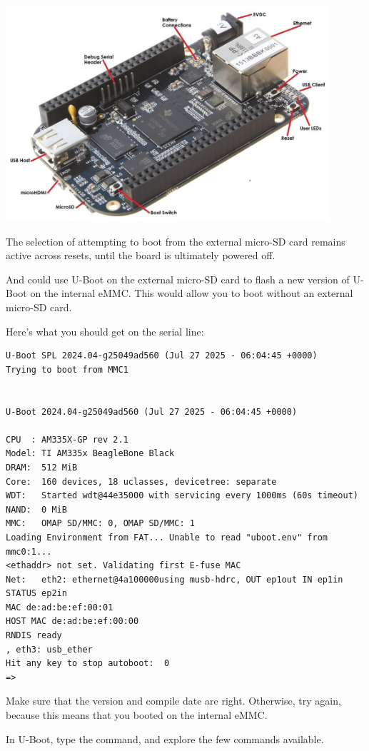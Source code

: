 \begin{center}
\includegraphics[width=12cm]{labs/u-boot-installing-bbb/bbb-peripheral.png}
\end{center}

The selection of attempting to boot from the external micro-SD card
remains active across resets, until the board is ultimately powered off.

And could use U-Boot on the external micro-SD card to flash a new version of U-Boot
on the internal eMMC. This would allow you to boot without an external micro-SD card.

Here's what you should get on the serial line:

\begin{verbatim}
U-Boot SPL 2024.04-g25049ad560 (Jul 27 2025 - 06:04:45 +0000)
Trying to boot from MMC1


U-Boot 2024.04-g25049ad560 (Jul 27 2025 - 06:04:45 +0000)

CPU  : AM335X-GP rev 2.1
Model: TI AM335x BeagleBone Black
DRAM:  512 MiB
Core:  160 devices, 18 uclasses, devicetree: separate
WDT:   Started wdt@44e35000 with servicing every 1000ms (60s timeout)
NAND:  0 MiB
MMC:   OMAP SD/MMC: 0, OMAP SD/MMC: 1
Loading Environment from FAT... Unable to read "uboot.env" from mmc0:1...
<ethaddr> not set. Validating first E-fuse MAC
Net:   eth2: ethernet@4a100000using musb-hdrc, OUT ep1out IN ep1in STATUS ep2in
MAC de:ad:be:ef:00:01
HOST MAC de:ad:be:ef:00:00
RNDIS ready
, eth3: usb_ether
Hit any key to stop autoboot:  0
=>
\end{verbatim}

Make sure that the version and compile date are right. Otherwise, try
again, because this means that you booted on the internal eMMC.

In U-Boot, type the  command, and explore the few commands
available.

